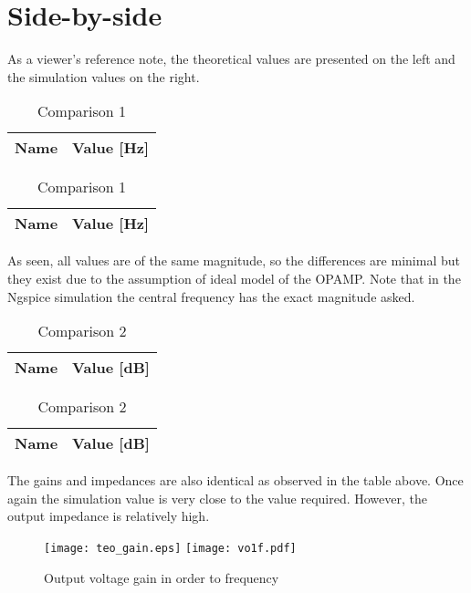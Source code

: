 \section{Side-by-side}
\label{sec:sbs}

As a viewer's reference note, the theoretical values are presented on the left and the simulation values on the right.

\begin{table}[h]
\begin{center}
  \begin{tabular}{|c|c|}
    \hline    
    {\bf Name} & {\bf Value [Hz]} \\ \hline
    
    \hline
  \end{tabular}
  \begin{tabular}{|c||c|}
    \hline    
    {\bf Name} & {\bf Value [Hz]} \\ \hline
    
    \hline
  \end{tabular}
  \caption{Comparison 1}
  \label{tab:comparison 1}
\end{center}
\end{table}
\FloatBarrier

As seen, all values are of the same magnitude, so the differences are minimal but they exist due to the assumption of ideal model of the OPAMP. Note that in the Ngspice simulation the central frequency has the exact magnitude asked.

\begin{table}[h]
\begin{center}
  \begin{tabular}{|c|c|}
    \hline    
    {\bf Name} & {\bf Value [dB]} \\ \hline
    
    \hline
  \end{tabular}
  \begin{tabular}{|c||c|}
    \hline    
    {\bf Name} & {\bf Value [dB]} \\ \hline
    
    \hline
  \end{tabular}
  \caption{Comparison 2}
  \label{tab:comparison 2}
\end{center}
\end{table}
\FloatBarrier

The gains and impedances are also identical as observed in the table above. Once again the simulation value is very close to the value required. However, the output impedance is relatively high.

\begin{figure}[h] \centering
\texttt{[image: teo\_gain.eps]}
\texttt{[image: vo1f.pdf]}
\caption{Output voltage gain in order to frequency}
\label{fig:comparison 3}
\end{figure}
\FloatBarrier

